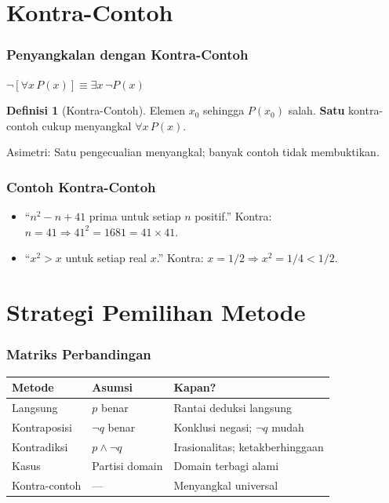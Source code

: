 \documentclass[handout]{beamer}
\theoremstyle{definition}
\newtheorem{definisi}[theorem]{Definisi}
\theoremstyle{example}
\begin{document}
\section{Kontra-Contoh}

\begin{frame}
\frametitle{Penyangkalan dengan Kontra-Contoh}
$\neg[\forall x\, P(x)] \equiv \exists x\, \neg P(x)$
\begin{definisi}[Kontra-Contoh]
Elemen $x_0$ sehingga $P(x_0)$ salah. \textbf{Satu} kontra-contoh cukup menyangkal $\forall x\, P(x)$.
\end{definisi}
Asimetri: Satu pengecualian menyangkal; banyak contoh tidak membuktikan.
\end{frame}

\begin{frame}
\frametitle{Contoh Kontra-Contoh}
\begin{itemize}
  \item ``$n^2 - n + 41$ prima untuk setiap $n$ positif.'' Kontra: $n=41 \Rightarrow 41^2 = 1681 = 41 \times 41$.
  \item ``$x^2 > x$ untuk setiap real $x$.'' Kontra: $x = 1/2 \Rightarrow x^2 = 1/4 < 1/2$.
\end{itemize}
\end{frame}

\section{Strategi Pemilihan Metode}

\begin{frame}
\frametitle{Matriks Perbandingan}
\begin{center}
\scriptsize
\begin{tabular}{|l|l|l|}
\hline
\textbf{Metode} & \textbf{Asumsi} & \textbf{Kapan?} \\ \hline
Langsung & $p$ benar & Rantai deduksi langsung \\ \hline
Kontraposisi & $\neg q$ benar & Konklusi negasi; $\neg q$ mudah \\ \hline
Kontradiksi & $p \wedge \neg q$ & Irasionalitas; ketakberhinggaan \\ \hline
Kasus & Partisi domain & Domain terbagi alami \\ \hline
Kontra-contoh & --- & Menyangkal universal \\ \hline
\end{tabular}
\end{center}
\end{frame}
\end{document}
